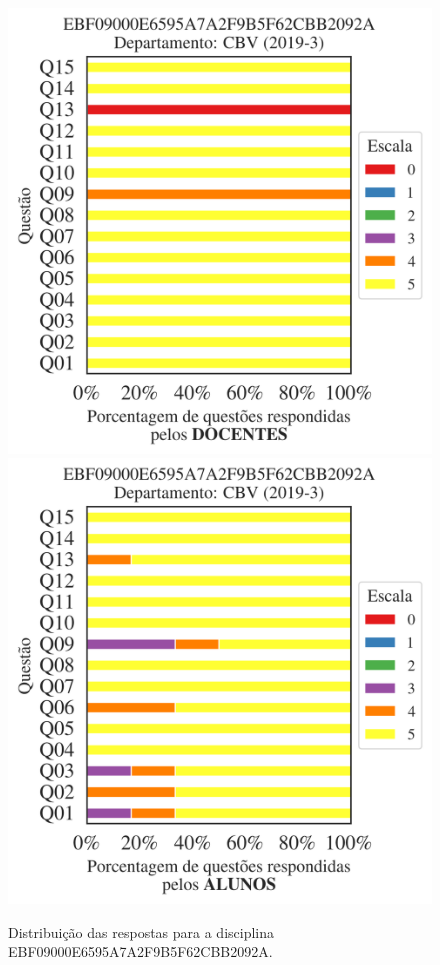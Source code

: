 \documentclass[a4paper,10pt]{article}
\begin{document}
\begin{figure}[h]
\centering
\includegraphics[width=0.485\linewidth]{analise_disciplina_departamento_CBV_EBF09000E6595A7A2F9B5F62CBB2092A_docentes.png}
\includegraphics[width=0.485\linewidth]{analise_disciplina_departamento_CBV_EBF09000E6595A7A2F9B5F62CBB2092A_alunos.png}
\caption{\label{fig:analise_geral_departamento}                Distribuição das respostas para a disciplina EBF09000E6595A7A2F9B5F62CBB2092A. }
\end{figure}
\end{document}
